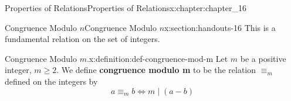 \documentclass[oneside,10pt,]{book}
\newcommand{\terminology}[1]{\textbf{#1}}
\numberwithin{equation}{section}
\begin{document}
\begin{chapterptx}{Properties of Relations}{}{Properties of Relations}{}{}{x:chapter:chapter_16}
\begin{sectionptx}{Congruence Modulo \(n\)}{}{Congruence Modulo \(n\)}{}{}{x:section:handouts-16}
This is a fundamental relation on the set of integers.%
\begin{definition}{Congruence Modulo \(m\).}{x:definition:def-congruence-mod-m}%
%
\label{g:notation:idm198360115808}%
\label{g:notation:idm198360114016}%
Let \(m\) be a positive integer, \(m\geq 2\).  We define \terminology{congruence modulo m} to be the relation \(\equiv_m\) defined on the integers by%
\begin{equation*}
a \equiv_m b \Leftrightarrow m \mid (a-b)
\end{equation*}
%
\end{definition}
\end{sectionptx}
\end{chapterptx}
%
%
\typeout{************************************************}
\typeout{************************************************}
%
\end{document}
